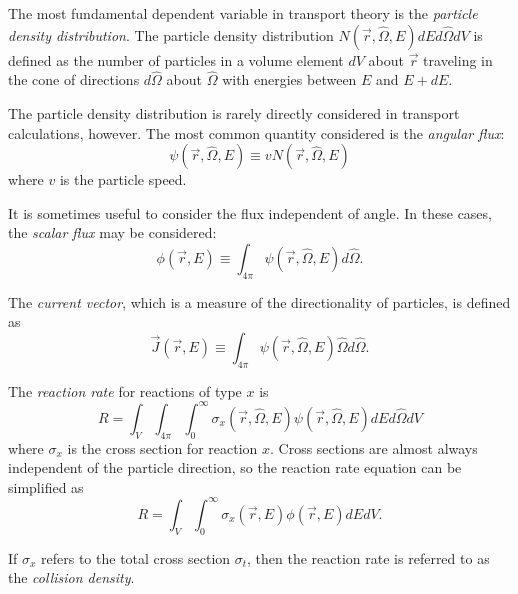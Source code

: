 The most fundamental dependent variable in transport theory is the \textit{particle density distribution}.
The particle density distribution $N\left(\vec{r},\hat{\Omega},E\right)dEd\hat{\Omega}dV$ is defined as the number of particles in a volume element $dV$ about $\vec{r}$ traveling in the cone of directions $d\hat{\Omega}$ about $\hat{\Omega}$ with energies between $E$ and $E + dE$.

The particle density distribution is rarely directly considered in transport calculations, however.
The most common quantity considered is the \textit{angular flux}:
\begin{equation}\label{eq:bg:rt:angular_flux}
  \psi\left(\vec{r},\hat{\Omega},E\right) \equiv vN\left(\vec{r},\hat{\Omega},E\right)
\end{equation}
where $v$ is the particle speed.

It is sometimes useful to consider the flux independent of angle.
In these cases, the \textit{scalar flux} may be considered:
\begin{equation}\label{eq:bg:rt:scalar_flux}
  \phi\left(\vec{r},E\right) \equiv \int_{4\pi}\psi\left(\vec{r},\hat{\Omega},E\right)d\hat{\Omega}.
\end{equation}

The \textit{current vector}, which is a measure of the directionality of particles, is defined as
\begin{equation}\label{eq:bg:rt:current_vector}
  \vec{J}\left(\vec{r},E\right) \equiv \int_{4\pi}\psi\left(\vec{r},\hat{\Omega},E\right)\hat{\Omega} d\hat{\Omega}.
\end{equation}

The \textit{reaction rate} for reactions of type $x$ is
\begin{equation}\label{eq:bg:rt:rxn_rate_angular}
  R = \int_V\int_{4\pi}\int_0^\infty\sigma_x\left(\vec{r},\hat{\Omega},E\right)\psi\left(\vec{r},\hat{\Omega},E\right)dEd\hat{\Omega}dV
\end{equation}
where $\sigma_x$ is the cross section for reaction $x$.
Cross sections are almost always independent of the particle direction, so the reaction rate equation can be simplified as
\begin{equation}\label{eq:bg:rt:rxn_rate_scalar}
  R = \int_V\int_0^\infty\sigma_x\left(\vec{r},E\right)\phi\left(\vec{r},E\right)dEdV.
\end{equation}

If $\sigma_x$ refers to the total cross section $\sigma_t$, then the reaction rate is referred to as the \textit{collision density}.

